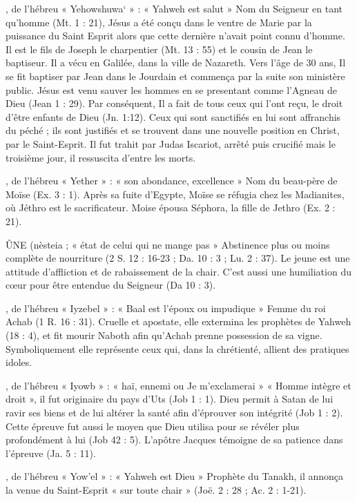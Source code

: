 \begin{multicols}{2}
, de l'hébreu « Yehowshuwa` » : « Yahweh est salut »
Nom du Seigneur en tant qu'homme (Mt. 1 : 21), Jésus a été conçu dans le ventre de Marie par la puissance du Saint Esprit alors que cette dernière n'avait point connu d'homme. Il est le fils de Joseph le charpentier (Mt. 13 : 55) et le cousin de Jean le baptiseur. Il a vécu en Galilée, dans la ville de Nazareth. Vers l'âge de 30 ans, Il se fit baptiser par Jean dans le Jourdain et commença par la suite son ministère public. Jésus est venu sauver les hommes en se presentant comme l'Agneau de Dieu (Jean 1 : 29). Par conséquent, Il a fait de tous ceux qui l’ont reçu, le droit d’être enfants de Dieu (Jn. 1:12). Ceux qui sont sanctifiés en lui sont affranchis du péché ; ils sont justifiés et se trouvent dans une nouvelle position en Christ, par le Saint-Esprit. Il fut trahit par Judas Iscariot, arrêté puis crucifié mais le troisième jour, il ressuscita d’entre les morts.


, de l'hébreu « Yether » : « son abondance, excellence »
Nom du beau-père de Moïse (Ex. 3 : 1).
Après sa fuite d'Egypte, Moïse se réfugia chez les Madianites, où Jéthro est le sacrificateur. Moise épousa Séphora, la fille de Jethro (Ex. 2 : 21).


ÛNE (nèsteia ; « état de celui qui ne mange pas »
Abstinence plus ou moins complète de nourriture (2 S. 12 : 16-23 ; Da. 10 : 3 ; Lu. 2 : 37). Le jeune est une attitude d'affliction et de rabaissement de la chair. C'est aussi une humiliation du cœur pour être entendue du Seigneur (Da 10 : 3).


, de l'hébreu « Iyzebel » : « Baal est l'époux ou impudique »
Femme du roi Achab (1 R. 16 : 31). Cruelle et apostate, elle extermina les prophètes de Yahweh (18 : 4), et fit mourir Naboth afin qu'Achab prenne possession de sa vigne. Symboliquement elle représente ceux qui, dans la chrétienté, allient des pratiques idoles.


, de l'hébreu « Iyowb » : « haï, ennemi ou Je m'exclamerai »
« Homme intègre et droit », il fut originaire du pays d'Uts (Job 1 : 1). Dieu permit à Satan de lui ravir ses biens et de lui altérer la santé afin d'éprouver son intégrité (Job 1 : 2). Cette épreuve fut aussi le moyen que Dieu utilisa pour se révéler plus profondément à lui (Job 42 : 5). L'apôtre Jacques témoigne de sa patience dans l'épreuve (Ja. 5 : 11).


, de l'hébreu « Yow'el » : « Yahweh est Dieu »
Prophète du Tanakh, il annonça la venue du Saint-Esprit « sur toute chair » (Joë. 2 : 28 ; Ac. 2 : 1-21).



\end{multicols}
